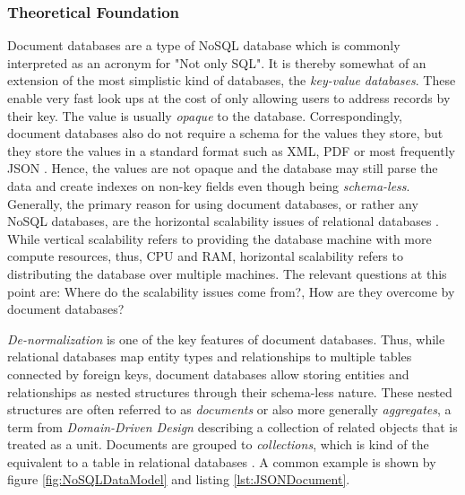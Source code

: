 \subsubsection{Theoretical Foundation}
Document databases are a type of NoSQL database which is commonly interpreted as an acronym for "Not only SQL". %
It is thereby somewhat of an extension of the most simplistic kind of databases, the \emph{key-value databases}. These enable very fast look ups at the cost of only allowing users to address records by their key. The value is usually \emph{opaque} to the database. Correspondingly, document databases also do not require a schema for the values they store, but they store the values in a standard format such as XML, PDF or most frequently JSON \cite{NoSQL}. %
Hence, the values are not opaque and the database may still parse the data and create indexes on non-key fields even though being \emph{schema-less}.\\

Generally, the primary reason for using document databases, or rather any NoSQL databases, are the horizontal scalability issues of relational databases \cite{NoSQL}. While vertical scalability refers to providing the database machine with more compute resources, thus, CPU and RAM, horizontal scalability refers to distributing the database over multiple machines. The relevant %
questions at this point are: Where do the scalability issues come from?, How are they overcome by document databases?\par
\emph{De-normalization} is one of the key features of document databases. Thus, while relational databases map entity types and relationships to multiple tables connected by foreign keys, document databases allow storing entities and relationships as nested structures through their schema-less nature. These nested structures are often referred to as \emph{documents} or also more generally \emph{aggregates}, a term from \emph{Domain-Driven Design} describing a collection of related objects that is treated as a unit. Documents are grouped to \emph{collections}, which is kind of the equivalent to a table in relational databases \cite{NoSQLDistilled}. A common example is shown by figure \ref{fig:NoSQLDataModel} and listing \ref{lst:JSONDocument}.\par 

